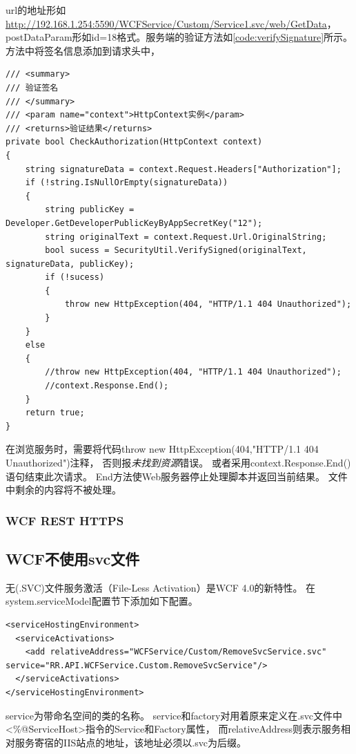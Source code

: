 \documentclass{book}
\begin{document}
url的地址形如\url{http://192.168.1.254:5590/WCFService/Custom/Service1.svc/web/GetData}，
postDataParam形如id=18格式。服务端的验证方法如\ref{code:verifySignature}所示。
方法中将签名信息添加到请求头中，

\begin{lstlisting}[language={[Sharp]C},caption=服务端验证请求,label={code:verifySignature}]
/// <summary>
/// 验证签名
/// </summary>
/// <param name="context">HttpContext实例</param>
/// <returns>验证结果</returns>
private bool CheckAuthorization(HttpContext context)
{	
    string signatureData = context.Request.Headers["Authorization"];
    if (!string.IsNullOrEmpty(signatureData))
    {
        string publicKey = Developer.GetDeveloperPublicKeyByAppSecretKey("12");
        string originalText = context.Request.Url.OriginalString;
        bool sucess = SecurityUtil.VerifySigned(originalText, signatureData, publicKey);
        if (!sucess)
        {
            throw new HttpException(404, "HTTP/1.1 404 Unauthorized");
        }
    }
    else
    {
        //throw new HttpException(404, "HTTP/1.1 404 Unauthorized");
        //context.Response.End();
    }
    return true;
}
\end{lstlisting}

在浏览服务时，需要将代码throw new HttpException(404,"HTTP/1.1 404 Unauthorized")注释，
否则报\emph{未找到资源}错误。
或者采用context.Response.End()语句结束此次请求。
End方法使Web服务器停止处理脚本并返回当前结果。
文件中剩余的内容将不被处理。

\subsubsection{WCF REST HTTPS}

\subsection{WCF不使用svc文件}

无(.SVC)文件服务激活（File-Less Activation）是WCF 4.0的新特性。
在system.serviceModel配置节下添加如下配置。

\begin{lstlisting}
<serviceHostingEnvironment>
  <serviceActivations>
    <add relativeAddress="WCFService/Custom/RemoveSvcService.svc" service="RR.API.WCFService.Custom.RemoveSvcService"/>
  </serviceActivations>
</serviceHostingEnvironment>
\end{lstlisting}

service为带命名空间的类的名称。
service和factory对用着原来定义在.svc文件中<\%@ServiceHost>指令的Service和Factory属性，
而relativeAddress则表示服务相对服务寄宿的IIS站点的地址，该地址必须以.svc为后缀。
\end{document}
